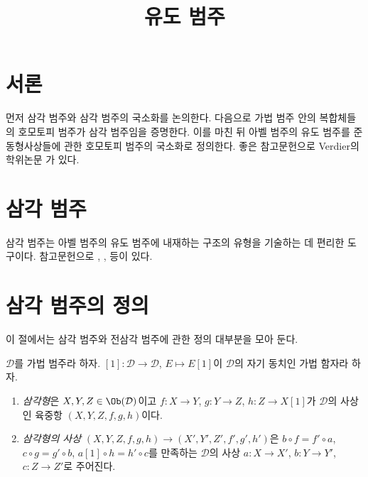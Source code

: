 

%


\title{유도 범주}


\maketitle

\label{section-phantom}

\tableofcontents

\section{서론}
\label{section-introduction}

\noindent
먼저 삼각 범주와 삼각 범주의 국소화를 논의한다. 다음으로 가법 범주 안의
복합체들의 호모토피 범주가 삼각 범주임을 증명한다. 이를 마친 뒤 아벨 범주의
유도 범주를 준동형사상들에 관한 호모토피 범주의 국소화로 정의한다.
좋은 참고문헌으로 Verdier의 학위논문 \cite{Verdier}가 있다.



\section{삼각 범주}
\label{section-triangulated-categories}

\noindent
삼각 범주는 아벨 범주의 유도 범주에 내재하는 구조의 유형을 기술하는 데
편리한 도구이다. 참고문헌으로 \cite{Verdier}, \cite{KS}, \cite{Neeman} 등이 있다.




\section{삼각 범주의 정의}
\label{section-triangulated-definitions}

\noindent
이 절에서는 삼각 범주와 전삼각 범주에 관한 정의 대부분을 모아 둔다.

\begin{definition}
\label{definition-triangle}
$\mathcal{D}$를 가법 범주라 하자.
$[1] : \mathcal{D} \to \mathcal{D}$, $E \mapsto E[1]$이
$\mathcal{D}$의 자기 동치인 가법 함자라 하자.
\begin{enumerate}
\item {\it 삼각형}은 $X, Y, Z \in \Ob(\mathcal{D})$이고
$f : X \to Y$, $g : Y \to Z$, $h : Z \to X[1]$가
$\mathcal{D}$의 사상인 육중항 $(X, Y, Z, f, g, h)$이다.
\item {\it 삼각형의 사상}
$(X, Y, Z, f, g, h) \to (X', Y', Z', f', g', h')$은
$b \circ f = f' \circ a$, $c  \circ g = g' \circ b$,
$a[1] \circ h = h' \circ c$를 만족하는 $\mathcal{D}$의 사상
$a : X \to X'$, $b : Y \to Y'$, $c : Z \to Z'$로 주어진다.
\end{enumerate}
\end{definition}

